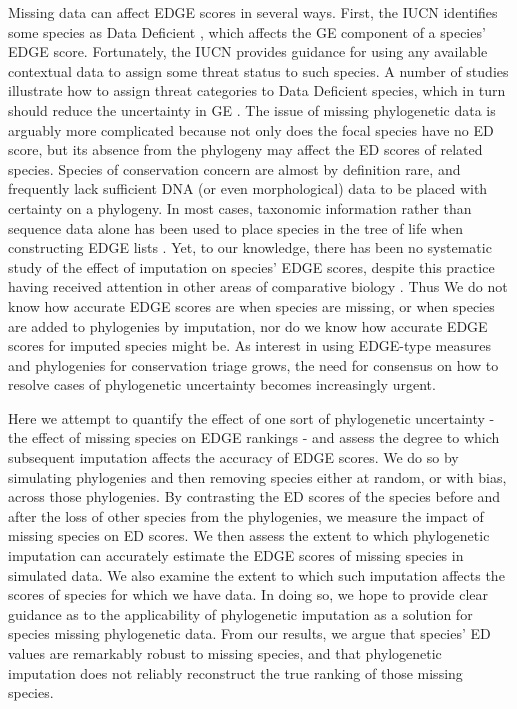 \documentclass[10pt,english]{article}
\begin{document}
Missing data can affect EDGE scores in several ways. First, the IUCN identifies
some species as Data Deficient \autocite{Iucn2001, Iucn2008}, which affects the
GE component of a species' EDGE score. Fortunately, the IUCN provides guidance
for using any available contextual data to assign some threat status to such
species. A number of studies illustrate how to assign threat categories to Data
Deficient species, which in turn should reduce the uncertainty in GE
\autocite{Good2006, Butchart2010, Morais2013, Dulvy2014}. The issue of missing
phylogenetic data is arguably more complicated because not only does the focal
species have no ED score, but its absence from the phylogeny may affect the ED
scores of related species. Species of conservation concern are almost by
definition rare, and frequently lack sufficient DNA (or even morphological) data
to be placed with certainty on a phylogeny. In most cases, taxonomic information
rather than sequence data alone has been used to place species in the tree of
life when constructing EDGE lists \autocite[see][]{Isaac2007, Collen2011,
Isaac2012, Jetz2014, Curnick2015, Stein2018, Gumbs2018, Forest2018}. Yet, to our
knowledge, there has been no systematic study of the effect of imputation on
species’ EDGE scores, despite this practice having received attention in other
areas of comparative biology \autocite{Kuhn2011, Thomas2013, Rabosky2015}. Thus
We do not know how accurate EDGE scores are when species are missing, or when
species are added to phylogenies by imputation, nor do we know how accurate EDGE
scores for imputed species might be. As interest in using EDGE-type measures
and phylogenies for conservation triage grows, the need for consensus on how to
resolve cases of phylogenetic uncertainty becomes increasingly urgent.

Here we attempt to quantify the effect of one sort of phylogenetic uncertainty
- the effect of missing species on EDGE rankings - and assess the degree to
which subsequent imputation affects the accuracy of EDGE scores. We do so by
simulating phylogenies and then removing species either at random, or with bias,
across those phylogenies. By contrasting the ED scores of the species before and
after the loss of other species from the phylogenies, we measure the impact of
missing species on ED scores. We then assess the extent to which phylogenetic
imputation can accurately estimate the EDGE scores of missing species in
simulated data. We also examine the extent to which such imputation affects the
scores of species for which we have data. In doing so, we hope to provide clear
guidance as to the applicability of phylogenetic imputation as a solution for
species missing phylogenetic data. From our results, we argue that species’ ED
values are remarkably robust to missing species, and that phylogenetic
imputation does not reliably reconstruct the true ranking of those missing
species.
\end{document}
